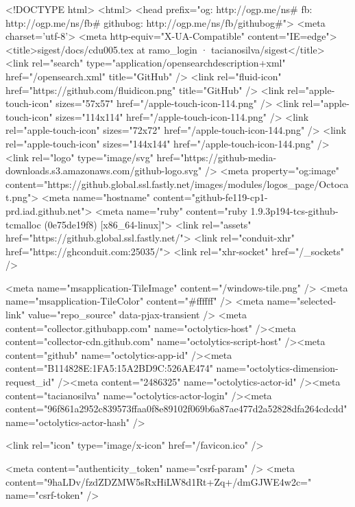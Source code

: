 


<!DOCTYPE html>
<html>
  <head prefix="og: http://ogp.me/ns# fb: http://ogp.me/ns/fb# githubog: http://ogp.me/ns/fb/githubog#">
    <meta charset='utf-8'>
    <meta http-equiv="X-UA-Compatible" content="IE=edge">
        <title>sigest/docs/cdu005.tex at ramo_login · tacianosilva/sigest</title>
    <link rel="search" type="application/opensearchdescription+xml" href="/opensearch.xml" title="GitHub" />
    <link rel="fluid-icon" href="https://github.com/fluidicon.png" title="GitHub" />
    <link rel="apple-touch-icon" sizes="57x57" href="/apple-touch-icon-114.png" />
    <link rel="apple-touch-icon" sizes="114x114" href="/apple-touch-icon-114.png" />
    <link rel="apple-touch-icon" sizes="72x72" href="/apple-touch-icon-144.png" />
    <link rel="apple-touch-icon" sizes="144x144" href="/apple-touch-icon-144.png" />
    <link rel="logo" type="image/svg" href="https://github-media-downloads.s3.amazonaws.com/github-logo.svg" />
    <meta property="og:image" content="https://github.global.ssl.fastly.net/images/modules/logos_page/Octocat.png">
    <meta name="hostname" content="github-fe119-cp1-prd.iad.github.net">
    <meta name="ruby" content="ruby 1.9.3p194-tcs-github-tcmalloc (0e75de19f8) [x86_64-linux]">
    <link rel="assets" href="https://github.global.ssl.fastly.net/">
    <link rel="conduit-xhr" href="https://ghconduit.com:25035/">
    <link rel="xhr-socket" href="/_sockets" />
    


    <meta name="msapplication-TileImage" content="/windows-tile.png" />
    <meta name="msapplication-TileColor" content="#ffffff" />
    <meta name="selected-link" value="repo_source" data-pjax-transient />
    <meta content="collector.githubapp.com" name="octolytics-host" /><meta content="collector-cdn.github.com" name="octolytics-script-host" /><meta content="github" name="octolytics-app-id" /><meta content="B114828E:1FA5:15A2BD9C:526AE474" name="octolytics-dimension-request_id" /><meta content="2486325" name="octolytics-actor-id" /><meta content="tacianosilva" name="octolytics-actor-login" /><meta content="96f861a2952c839573ffaa0f8e89102f069b6a87ae477d2a52828dfa264cdcdd" name="octolytics-actor-hash" />
    

    
    
    <link rel="icon" type="image/x-icon" href="/favicon.ico" />

    <meta content="authenticity_token" name="csrf-param" />
<meta content="9haLDv/fzdZDZMW5sRxHiLW8d1Rt+Zq+/dmGJWE4w2c=" name="csrf-token" />

